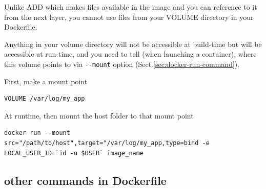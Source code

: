 Unlike ADD which makes files available in the image and you can reference to it
from the next layer, you cannot use files from your VOLUME directory in your
Dockerfile.

Anything in your volume directory will not be accessible at build-time but will
be accessible at run-time, and you need to tell (when launching a container),
where this volume points to via \verb!--mount! option (Sect.\ref{sec:docker-run-command}).

First, make a mount point 
\begin{verbatim}
VOLUME /var/log/my_app
\end{verbatim}

At runtime, then mount the host folder to that mount point
\begin{verbatim}
docker run --mount src="/path/to/host",target="/var/log/my_app,type=bind -e LOCAL_USER_ID=`id -u $USER` image_name
\end{verbatim}



\subsection{other commands in Dockerfile}

